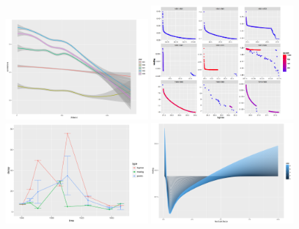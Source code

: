 \begin{figure}%
\centering
\includegraphics[width=0.48\textwidth]{figures/macro_empirical_tsCorrelations}
\includegraphics[width=0.48\textwidth]{figures/macro_gravity}\\
\includegraphics[width=0.48\textwidth]{figures/macro_argmins_gravityDecay}
\includegraphics[width=0.48\textwidth]{figures/macro_mselog-feedbackDecay_ZOOM_fixedgravity}

\end{figure}
